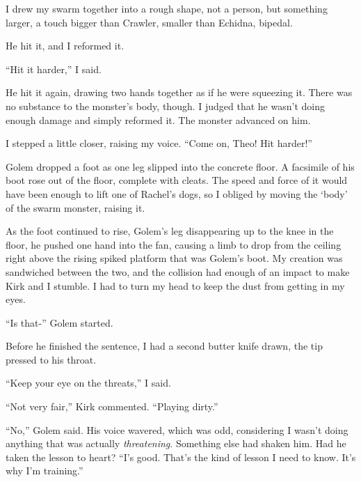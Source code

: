 I drew my swarm together into a rough shape, not a person, but something larger, a touch bigger than Crawler, smaller than Echidna, bipedal.



He hit it, and I reformed it.



``Hit it harder,'' I said.



He hit it again, drawing two hands together as if he were squeezing it.  There was no substance to the monster's body, though.  I judged that he wasn't doing enough damage and simply reformed it.  The monster advanced on him.



I stepped a little closer, raising my voice.  ``Come on, Theo!  Hit harder!''



Golem dropped a foot as one leg slipped into the concrete floor.  A facsimile of his boot rose out of the floor, complete with cleats.  The speed and force of it would have been enough to lift one of Rachel's dogs, so I obliged by moving the `body' of the swarm monster, raising it.



As the foot continued to rise, Golem's leg disappearing up to the knee in the floor, he pushed one hand into the fan, causing a limb to drop from the ceiling right above the rising spiked platform that was Golem's boot.  My creation was sandwiched between the two, and the collision had enough of an impact to make Kirk and I stumble.  I had to turn my head to keep the dust from getting in my eyes.



``Is that-'' Golem started.



Before he finished the sentence, I had a second butter knife drawn, the tip pressed to his throat.



``Keep your eye on the threats,'' I said.



``Not very fair,'' Kirk commented.  ``Playing dirty.''



``No,'' Golem said.  His voice wavered, which was odd, considering I wasn't doing anything that was actually \emph{threatening}.  Something else had shaken him.  Had he taken the lesson to heart?  ``I's good.  That's the kind of lesson I need to know.  It's why I'm training.''



